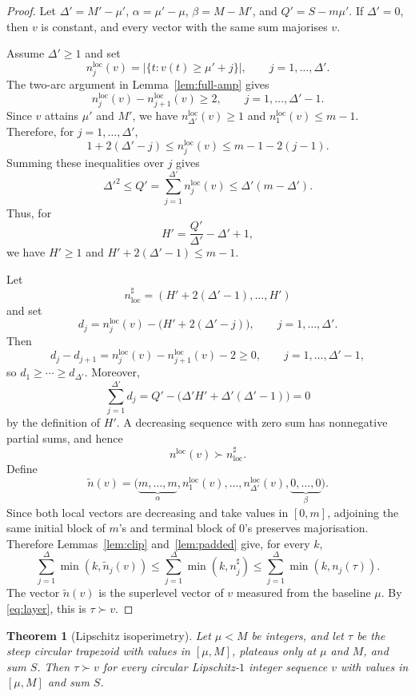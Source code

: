\documentclass[11pt]{article}
\newtheorem{theorem}{Theorem}[section]
\theoremstyle{definition}
\begin{document}
\begin{proof}
Let $\Delta'=M'-\mu'$, $\alpha=\mu'-\mu$, $\beta=M-M'$, and $Q'=S-m\mu'$. If $\Delta'=0$, then $v$ is constant, and every vector with the same sum majorises $v$.

Assume $\Delta'\ge1$ and set
\[
n_j^{\mathrm{loc}}(v)=|\{t:v(t)\ge\mu'+j\}|,
\qquad j=1,\dots,\Delta'.
\]
The two-arc argument in Lemma~\ref{lem:full-amp} gives
\[
n_j^{\mathrm{loc}}(v)-n_{j+1}^{\mathrm{loc}}(v)\ge2,
\qquad j=1,\dots,\Delta'-1.
\]
Since $v$ attains $\mu'$ and $M'$, we have $n_{\Delta'}^{\mathrm{loc}}(v)\ge1$ and $n_1^{\mathrm{loc}}(v)\le m-1$. Therefore, for $j=1,\dots,\Delta'$,
\[
1+2(\Delta'-j)
\le n_j^{\mathrm{loc}}(v)
\le m-1-2(j-1).
\]
Summing these inequalities over $j$ gives
\[
\Delta'^2\le Q'=\sum_{j=1}^{\Delta'}n_j^{\mathrm{loc}}(v)
\le\Delta'(m-\Delta').
\]
Thus, for
\[
H'=\frac{Q'}{\Delta'}-\Delta'+1,
\]
we have $H'\ge1$ and $H'+2(\Delta'-1)\le m-1$.

Let
\[
n^\sharp_{\mathrm{loc}}=(H'+2(\Delta'-1),\dots,H')
\]
and set
\[
d_j=n_j^{\mathrm{loc}}(v)-\bigl(H'+2(\Delta'-j)\bigr),
\qquad j=1,\dots,\Delta'.
\]
Then
\[
d_j-d_{j+1}
=n_j^{\mathrm{loc}}(v)-n_{j+1}^{\mathrm{loc}}(v)-2
\ge0,
\qquad j=1,\dots,\Delta'-1,
\]
so $d_1\ge\cdots\ge d_{\Delta'}$. Moreover,
\[
\sum_{j=1}^{\Delta'}d_j
=Q'-\bigl(\Delta'H'+\Delta'(\Delta'-1)\bigr)
=0
\]
by the definition of $H'$. A decreasing sequence with zero sum has nonnegative partial sums, and hence
\[
n^{\mathrm{loc}}(v)\succ n^\sharp_{\mathrm{loc}}.
\]
Define
\[
\widetilde n(v)
=\bigl(
\underbrace{m,\dots,m}_{\alpha},
 n_1^{\mathrm{loc}}(v),\dots,n_{\Delta'}^{\mathrm{loc}}(v),
\underbrace{0,\dots,0}_{\beta}
\bigr).
\]
Since both local vectors are decreasing and take values in $[0,m]$, adjoining the same initial block of $m$'s and terminal block of $0$'s preserves majorisation. Therefore Lemmas~\ref{lem:clip} and~\ref{lem:padded} give, for every $k$,
\[
\sum_{j=1}^\Delta\min(k,\widetilde n_j(v))
\le
\sum_{j=1}^\Delta\min(k,n_j^\sharp)
\le
\sum_{j=1}^\Delta\min(k,n_j(\tau)).
\]
The vector $\widetilde n(v)$ is the superlevel vector of $v$ measured from the baseline $\mu$. By \eqref{eq:layer}, this is $\tau\succ v$.
\end{proof}

\begin{theorem}[Lipschitz isoperimetry]\label{thm:C}
Let $\mu<M$ be integers, and let $\tau$ be the steep circular trapezoid with values in $[\mu,M]$, plateaus only at $\mu$ and $M$, and sum $S$. Then $\tau\succ v$ for every circular Lipschitz-$1$ integer sequence $v$ with values in $[\mu,M]$ and sum $S$.
\end{theorem}
\end{document}
